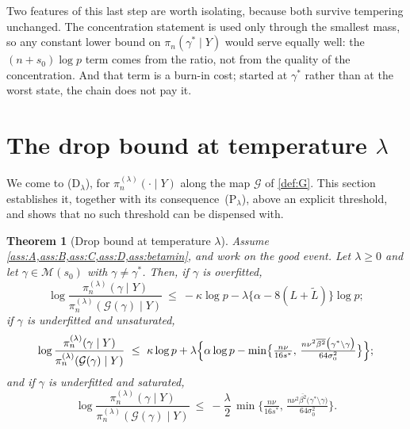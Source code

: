 \documentclass[aos]{imsart}
\newcommand{\Ltil}{\widetilde{L}}
\newcommand{\betabar}[1]{\overline{\beta^{2}}\bigl(#1\bigr)}
\newcommand{\gainfloorMs}{%
    \min\bigl\{\tfrac{n\nu}{16s^{\ast}},\,
    \tfrac{n\nu^{2}\betabar{\gamma^{\ast}\setminus\gamma}}
    {64\sigma_0^{2}}\bigr\}}
\theoremstyle{plain}
\newtheorem{theorem}{Theorem}[section]
\theoremstyle{definition}
\begin{document}
    Two features of this last step are worth isolating, because both survive
    tempering unchanged. The concentration statement is used only through
    the smallest mass, so any constant lower bound on
    $\pi_n(\gamma^{\ast}\mid Y)$ would serve equally well: the
    $(n+s_0)\log p$ term comes from the ratio, not from the quality of the
    concentration. And that term is a burn-in cost; started at
    $\gamma^{\ast}$ rather than at the worst state, the chain does not pay
    it.




    \section{The drop bound at temperature $\lambda$}
    \label{sec:main}

    We come to (D$_\lambda$), for $\pi_n^{(\lambda)}(\cdot\mid Y)$ along the
    map $\mathcal{G}$ of \cref{def:G}. This section establishes it, together
    with its consequence~(P$_\lambda$), above an explicit threshold, and
    shows that no such threshold can be dispensed with.

    \begin{theorem}[Drop bound at temperature $\lambda$]
        \label{th:drop}
        Assume \cref{ass:A,ass:B,ass:C,ass:D,ass:betamin},
        and work on the good event. Let $\lambda\geq0$ and let
        $\gamma\in\mathscr{M}(s_0)$ with $\gamma\neq\gamma^{\ast}$. Then, if $\gamma$ is overfitted,
        \begin{equation}
            \label{eq:drop_over}
            \log\frac{\pi_n^{(\lambda)}(\gamma\mid Y)}
            {\pi_n^{(\lambda)}(\mathcal{G}(\gamma)\mid Y)}
            \ \leq\ -\kappa\log p
            -\lambda\bigl\{\alpha-8(L+\Ltil)\bigr\}\log p ;
        \end{equation}
        if $\gamma$ is underfitted and unsaturated,
        \begin{equation}
            \label{eq:drop_unsat}
            \log\frac{\pi_n^{(\lambda)}(\gamma\mid Y)}
            {\pi_n^{(\lambda)}(\mathcal{G}(\gamma)\mid Y)}
            \ \leq\ \kappa\log p
            +\lambda\Bigl\{\alpha\log p-\gainfloorMs\Bigr\} ;
        \end{equation}
        and if $\gamma$ is underfitted and saturated,
        \begin{equation}
            \label{eq:drop_sat}
            \log\frac{\pi_n^{(\lambda)}(\gamma\mid Y)}
            {\pi_n^{(\lambda)}(\mathcal{G}(\gamma)\mid Y)}
            \ \leq\ -\frac{\lambda}{2}\,\gainfloorMs .
        \end{equation}
    \end{theorem}
\end{document}
